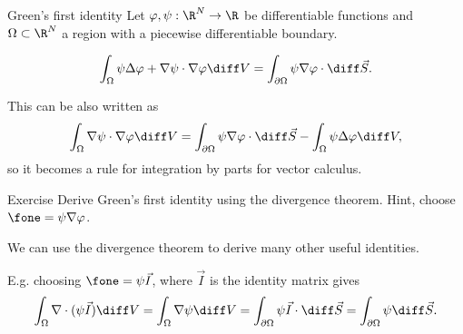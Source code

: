 \begin{frame}{Green's first identity}
	Let $ \varphi, \psi: \R^N \to \R $ be differentiable functions and $ \Omega \subset \R^N $ a region with a piecewise differentiable boundary. 
	
	\pause
	\[ \int_{\Omega} \psi \Delta \varphi + \nabla \psi \cdot \nabla \varphi \diff V  
	= \int_{\partial \Omega} \psi \nabla \varphi \cdot \diff \vec{S}.
	\]
	
	\pause
	This can be also written as 
	\[  \int_{\Omega} \nabla \psi \cdot \nabla \varphi \diff V 
	= \int_{\partial \Omega} \psi \nabla \varphi \cdot \diff \vec{S} - 
	\int_{\Omega} \psi \Delta \varphi  \diff V,
	\]
	so it becomes a rule for integration by parts for vector calculus.
\end{frame}

\begin{frame}{Exercise}
	Derive Green's first identity using the divergence theorem. Hint, choose $ \fone = \psi \nabla \varphi $.
\end{frame}

\begin{frame}
	We can use the divergence theorem to derive many other useful identities. 
	
	\pause
	E.g. choosing $ \fone = \psi \vec{I} $, where $ \vec{I} $ is the identity matrix gives 
	\[ \int_{\Omega} \nabla \cdot (\psi \vec{I}) \diff V = \int_{\Omega} \nabla\psi \diff V = \int_{\partial \Omega} \psi \vec{I} \cdot \diff \vec{S} = \int_{\partial \Omega} \psi  \diff \vec{S}. \]
\end{frame}



